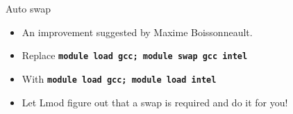 \documentclass{beamer}
\begin{document}
\begin{frame}{Auto swap}
  \begin{itemize}
      \item An improvement suggested by Maxime Boissonneault.
      \item Replace \texttt{\bf module load gcc; module swap gcc intel}
      \item With \texttt{\bf module load gcc; module load intel}
      \item Let Lmod figure out that a swap is required and do it for you!
  \end{itemize}
\end{frame}
\end{document}
